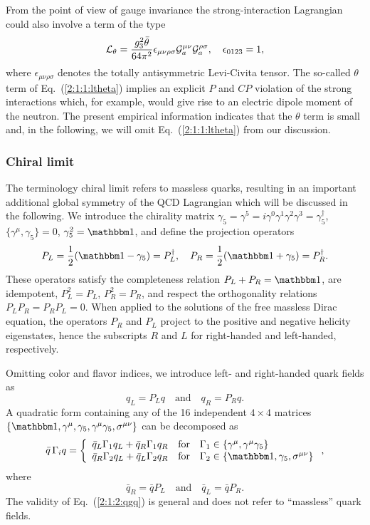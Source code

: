 \documentclass[twoside,12pt]{article}
\begin{document}
   From the point of view of gauge invariance the strong-interaction
Lagrangian could also involve a term of the type
\begin{equation}
\label{2:1:1:ltheta} {\cal
L}_\theta=\frac{g^2_3\bar{\theta}}{64\pi^2}\epsilon_{\mu\nu\rho\sigma}
{\cal G}_a^{\mu\nu}{\cal G}_a^{\rho\sigma},\quad \epsilon_{0123}=1,
\end{equation}
where $\epsilon_{\mu\nu\rho\sigma}$ denotes the totally
antisymmetric Levi-Civita tensor.
   The so-called $\theta$ term of Eq.\ (\ref{2:1:1:ltheta}) implies an explicit
$P$ and $CP$ violation of the strong interactions which, for
example, would give rise to an electric dipole moment of the
neutron.
   The present empirical information indicates that the $\theta$ term is
small and, in the following, we will omit Eq.\ (\ref{2:1:1:ltheta})
from our discussion.

\subsubsection{Chiral limit}
   The terminology chiral limit refers to massless quarks, resulting in
an important additional global symmetry of the QCD Lagrangian which will
be discussed in the following.
    We introduce the chirality matrix
$\gamma_5=\gamma^5=i\gamma^0\gamma^1\gamma^2\gamma^3=\gamma_5^\dagger$,
$\{\gamma^\mu,\gamma_5\}=0$, $\gamma_5^2=\mathbbm 1$, and define the projection operators
\begin{equation}
\label{2:1:2:prpl}
P_L=\frac{1}{2}({\mathbbm 1}-\gamma_5)=P_L^\dagger,\quad
P_R=\frac{1}{2}({\mathbbm 1}+\gamma_5)=P_R^\dagger.
\end{equation}
These operators satisfy the completeness relation $P_L+P_R=\mathbbm 1$,
are idempotent, $P_L^2=P_L$, $P_R^2=P_R$, and respect the orthogonality relations
$P_L P_R=P_R P_L=0$.
   When applied to the solutions of the free massless Dirac equation,
the operators $P_R$ and $P_L$ project to the
positive and negative helicity eigenstates, hence the subscripts
$R$ and $L$ for right-handed and left-handed, respectively.

   Omitting color and flavor indices, we introduce left- and right-handed quark fields as
\begin{equation}
\label{2:1:2:qlr}
q_L=P_L q\quad\mbox{and}\quad q_R=P_R q.
\end{equation}
   A quadratic form containing any of the 16 independent $4\times 4$ matrices
$\{{\mathbbm 1},\gamma^\mu,\gamma_5,\gamma^\mu\gamma_5,\sigma^{\mu\nu}\}$
can be decomposed as
\begin{equation}
\label{2:1:2:qgq}
\bar{q}\,\Gamma_i q=\left \{\begin{array}{lcl}
\bar{q}_L\Gamma_1 q_L+\bar{q}_R\Gamma_1 q_R&\mbox{for}&
\Gamma_1\in\{\gamma^\mu,\gamma^\mu\gamma_5\}\\
\bar{q}_R\Gamma_2 q_L +\bar{q}_L\Gamma_2 q_R&\mbox{for}& \Gamma_2
\in\{{\mathbbm 1},\gamma_5,\sigma^{\mu\nu}\}
\end{array}
\right.,
\end{equation}
where
$$ \bar{q}_R=\bar{q}P_L\quad\mbox{and}\quad \bar{q}_L=\bar{q}P_R.
$$
  The validity of Eq.\ (\ref{2:1:2:qgq}) is general
and does not refer to ``massless'' quark fields.
\end{document}
